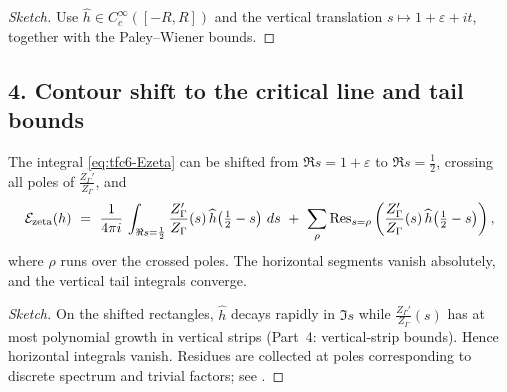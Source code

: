 \begin{proof}[Sketch]\relax\hspace{0pt}
Use $\widehat{h}\in C_c^\infty([-R,R])$ and the vertical translation $s\mapsto 1+\varepsilon+it$, together with the Paley--Wiener bounds. \relax\hspace{0pt}
\end{proof}

\subsection*{4. Contour shift to the critical line and tail bounds}\relax\hspace{0pt}
\label{subsec:tfc6-shift} %

\begin{theorem}\relax\hspace{0pt}
\label{thm:tfc6-shift}\relax\hspace{0pt}
The integral \eqref{eq:tfc6-Ezeta} can be shifted from $\Re s=1+\varepsilon$ to $\Re s=\tfrac12$, crossing all poles of $\frac{Z_\Gamma'}{Z_\Gamma}$, and
\begin{equation}\relax\hspace{0pt}
\label{eq:tfc6-contour-equality}\relax\hspace{0pt}
\mathcal{E}_{\mathrm{zeta}}(h)\ =\ \frac{1}{4\pi i}\,\int_{\Re s=\frac12}\frac{Z_\Gamma'}{Z_\Gamma}(s)\,\widehat{h}\!\left(\tfrac12-s\right)\,ds\ +\ \sum_{\rho}\mathrm{Res}_{s=\rho}\left(\frac{Z_\Gamma'}{Z_\Gamma}(s)\,\widehat{h}\!\left(\tfrac12-s\right)\right),
\end{equation}
where $\rho$ runs over the crossed poles. The horizontal segments vanish absolutely, and the vertical tail integrals converge. \relax\hspace{0pt}
\end{theorem}

\begin{proof}[Sketch]\relax\hspace{0pt}
On the shifted rectangles, $\widehat{h}$ decays rapidly in $\Im s$ while $\frac{Z_\Gamma'}{Z_\Gamma}(s)$ has at most polynomial growth in vertical strips (Part~4: vertical-strip bounds). Hence horizontal integrals vanish. Residues are collected at poles corresponding to discrete spectrum and trivial factors; see \cite{HejhalII}. \relax\hspace{0pt}
\end{proof}

